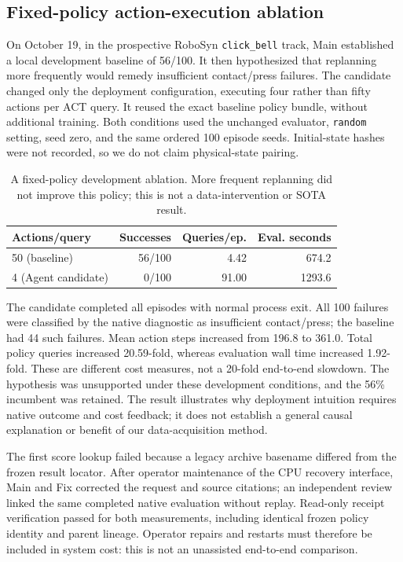 \documentclass[10pt,twocolumn,letterpaper]{article}
\begin{document}
\subsection{Fixed-policy action-execution ablation}
On October 19, in the prospective RoboSyn \texttt{click\_bell} track, Main
established a local development baseline of 56/100. It then hypothesized that
replanning more frequently would remedy insufficient contact/press failures.
The candidate changed only the deployment configuration, executing four rather
than fifty actions per ACT query. It reused the exact baseline policy bundle,
without additional training. Both conditions used the unchanged evaluator,
\texttt{random} setting, seed zero, and the same ordered 100 episode seeds.
Initial-state hashes were not recorded, so we do not claim physical-state pairing.

\begin{table}[t]
\centering
\small
\setlength{\tabcolsep}{4pt}
\begin{tabular}{lrrr}
\toprule
Actions/query & Successes & Queries/ep. & Eval. seconds \\
\midrule
50 (baseline) & 56/100 & 4.42 & 674.2 \\
4 (Agent candidate) & 0/100 & 91.00 & 1293.6 \\
\bottomrule
\end{tabular}
\caption{A fixed-policy development ablation. More frequent replanning did not
improve this policy; this is not a data-intervention or SOTA result.}
\label{tab:fixed-policy-execution}
\end{table}

The candidate completed all episodes with normal process exit. All 100 failures
were classified by the native diagnostic as insufficient contact/press; the
baseline had 44 such failures. Mean action steps increased from 196.8 to 361.0.
Total policy queries increased 20.59-fold, whereas evaluation wall time increased
1.92-fold. These are different cost measures, not a 20-fold end-to-end slowdown.
The hypothesis was unsupported under these development conditions, and the
56\% incumbent was retained. The result illustrates why deployment intuition
requires native outcome and cost feedback; it does not establish a general
causal explanation or benefit of our data-acquisition method.

The first score lookup failed because a legacy archive basename differed from
the frozen result locator. After operator maintenance of the CPU recovery
interface, Main and Fix corrected the request and source citations; an independent
review linked the same completed native evaluation without replay. Read-only
receipt verification passed for both measurements, including identical frozen
policy identity and parent lineage. Operator repairs and restarts must therefore
be included in system cost: this is not an unassisted end-to-end comparison.
\end{document}
